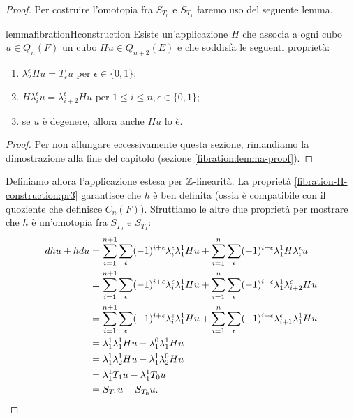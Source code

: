 \begin{proof}
Per costruire l'omotopia fra \(S_{T_0}\) e \(S_{T_1}\) faremo uso del seguente lemma.
\begin{restatable}{lemma}{fibrationHconstruction}\label{fibration-H-construction}
Esiste un'applicazione \(H\) che associa a ogni cubo \(u\in Q_n(F)\) un cubo \(Hu\in Q_{n+2}(E)\) e che soddisfa le seguenti proprietà:
\begin{enumerate}
\item\label{fibration-H-construction:pr1} \(\lambda^\epsilon_2Hu=T_\epsilon u\) per \(\epsilon\in\{0,1\}\);
\item\label{fibration-H-construction:pr2} \(H\lambda^\epsilon_iu=\lambda^\epsilon_{i+2}Hu\) per \(1\le i\le n,\epsilon\in\{0,1\}\);
\item\label{fibration-H-construction:pr3} se \(u\) è degenere, allora anche \(Hu\) lo è.
\end{enumerate}
\end{restatable}
\begin{proof}
Per non allungare eccessivamente questa sezione, rimandiamo la dimostrazione alla fine del capitolo (sezione \ref{fibration:lemma-proof}).
\end{proof}
Definiamo allora l'applicazione
estesa per \(\mathbb{Z}\)-linearità. La proprietà \ref{fibration-H-construction:pr3} garantisce che \(h\) è ben definita (ossia è compatibile con il quoziente che definisce \(C_n(F)\)). Sfruttiamo le altre due proprietà per mostrare che \(h\) è un'omotopia fra \(S_{T_0}\) e \(S_{T_1}\):
\begin{align*}
dhu+hdu&=\sum_{i=1}^{n+1}\sum_\epsilon(-1)^{i+\epsilon}\lambda^\epsilon_i\lambda^1_1Hu+\sum_{i=1}^n\sum_\epsilon(-1)^{i+\epsilon}\lambda^1_1H\lambda^\epsilon_iu\\
&=\sum_{i=1}^{n+1}\sum_\epsilon(-1)^{i+\epsilon}\lambda^\epsilon_i\lambda^1_1Hu+\sum_{i=1}^n\sum_\epsilon(-1)^{i+\epsilon}\lambda^1_1\lambda^\epsilon_{i+2}Hu\\
&=\sum_{i=1}^{n+1}\sum_\epsilon(-1)^{i+\epsilon}\lambda^\epsilon_i\lambda^1_1Hu+\sum_{i=1}^n\sum_\epsilon(-1)^{i+\epsilon}\lambda^\epsilon_{i+1}\lambda^1_1Hu\\
&=\lambda^1_1\lambda^1_1Hu-\lambda^0_1\lambda^1_1Hu\\
&=\lambda^1_1\lambda^1_2Hu-\lambda^1_1\lambda^0_2Hu\\
&=\lambda^1_1T_1u-\lambda^1_1T_0u\\
&=S_{T_1}u-S_{T_0}u.\qedhere
\end{align*}
\end{proof}

